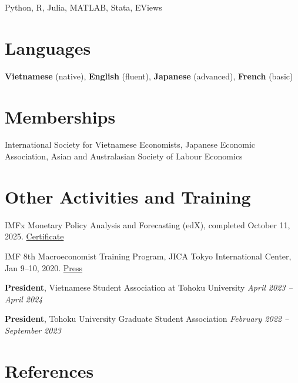 \documentclass[12pt]{article}
\begin{document}
Python, R, Julia, MATLAB, Stata, EViews

\section{Languages}

\textbf{Vietnamese} (native), \textbf{English} (fluent), \textbf{Japanese} (advanced), \textbf{French} (basic)

\section{Memberships}

International Society for Vietnamese Economists, Japanese Economic Association, Asian and Australasian Society of Labour Economics

\section{Other Activities and Training}

IMFx Monetary Policy Analysis and Forecasting (edX), completed October 11, 2025. \href{https://courses.edx.org/certificates/cba0e73cd51747e2ae0a105f8d9e9acc}{Certificate}

IMF 8th Macroeconomist Training Program, JICA Tokyo International Center, Jan 9--10, 2020. \href{https://www.imf.org/en/countries/resrep/oap-home/2020/mtp-20200109}{Press}

\textbf{President}, Vietnamese Student Association at Tohoku University \hfill \emph{April 2023 -- April 2024}

\textbf{President}, Tohoku University Graduate Student Association \hfill \emph{February 2022 -- September 2023}



\section{References}
\end{document}
